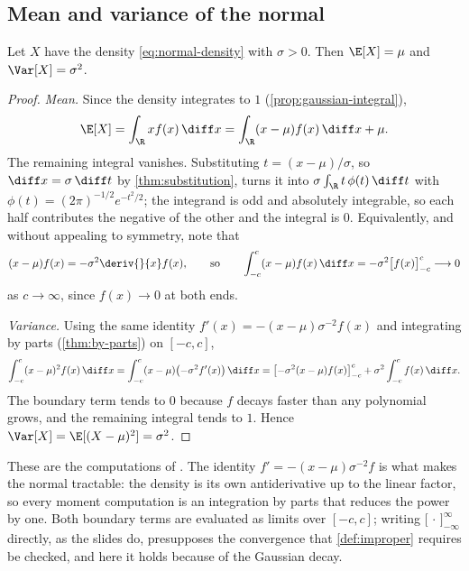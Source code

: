 \subsection{Mean and variance of the normal}\label{sec:int-normal}

\begin{proposition}\label{prop:normal-moments}
	Let $X$ have the density \eqref{eq:normal-density} with $\sigma>0$. Then
	$\E[X]=\mu$ and $\Var[X]=\sigma^2$.
\end{proposition}

\begin{proof}
	\emph{Mean.} Since the density integrates to $1$
	(\autoref{prop:gaussian-integral}),
	\[
		\E[X]=\int_{\R}xf(x)\,\diff x=\int_{\R}(x-\mu)f(x)\,\diff x+\mu .
	\]
	The remaining integral vanishes. Substituting $t=(x-\mu)/\sigma$, so
	$\diff x=\sigma\,\diff t$ by \autoref{thm:substitution}, turns it into
	$\sigma\int_{\R}t\,\phi(t)\,\diff t$ with $\phi(t)=(2\pi)^{-1/2}e^{-t^2/2}$; the
	integrand is odd and absolutely integrable, so each half contributes the
	negative of the other and the integral is $0$. Equivalently, and without
	appealing to symmetry, note that
	\[
		(x-\mu)f(x)=-\sigma^2\deriv{}{x}f(x),
		\qquad\text{so}\qquad
		\int_{-c}^{c}(x-\mu)f(x)\,\diff x=-\sigma^2\bigl[f(x)\bigr]_{-c}^{c}
		\longrightarrow0
	\]
	as $c\to\infty$, since $f(x)\to0$ at both ends.

	\emph{Variance.} Using the same identity $f'(x)=-(x-\mu)\sigma^{-2}f(x)$ and
	integrating by parts (\autoref{thm:by-parts}) on $[-c,c]$,
	\[
		\int_{-c}^{c}(x-\mu)^2f(x)\,\diff x
		=\int_{-c}^{c}(x-\mu)\bigl(-\sigma^2f'(x)\bigr)\,\diff x
		=\bigl[-\sigma^2(x-\mu)f(x)\bigr]_{-c}^{c}+\sigma^2\int_{-c}^{c}f(x)\,\diff x .
	\]
	The boundary term tends to $0$ because $f$ decays faster than any polynomial
	grows, and the remaining integral tends to $1$. Hence
	$\Var[X]=\E[(X-\mu)^2]=\sigma^2$.
\end{proof}

These are the computations of \autocite[slides 85--88]{fukuda2026calculus}. The
identity
$f'=-(x-\mu)\sigma^{-2}f$ is what makes the normal tractable: the density is its
own antiderivative up to the linear factor, so every moment computation is an
integration by parts that reduces the power by one. Both boundary terms
are evaluated as limits over $[-c,c]$; writing
$\bigl[\,\cdot\,\bigr]_{-\infty}^{\infty}$ directly, as the slides do,
presupposes the convergence that \autoref{def:improper} requires be checked, and
here it holds because of the Gaussian decay.

